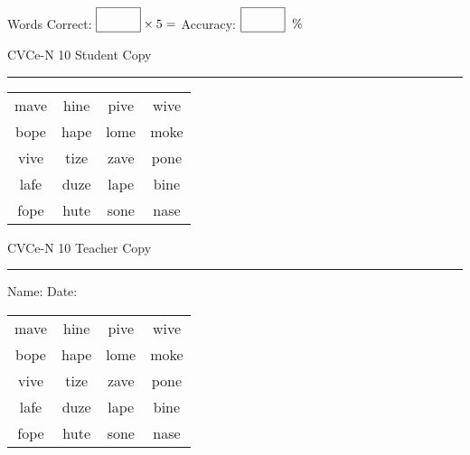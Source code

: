 \documentclass{memoir}
\begin{document}
\small

Words Correct: $\fbox{\phantom{\huge 100}} \times 5 = $ Accuracy: $\fbox{\phantom{\huge 100}}\;\; \%$ 

\vfill

\newpage


\footnotesize \noindent
CVCe-N 10 \hfill Student Copy
\smallskip
\hrule

\Large

\setlength{\tabcolsep}{14pt}
\def\arraystretch{2}

{\selectfont


\begin{vplace}[0.5]
\begin{center}
\begin{tabular}{cccc}
mave & hine & pive & wive \\
bope & hape & lome & moke \\
vive & tize & zave & pone \\
lafe & duze & lape & bine \\
fope & hute & sone & nase \\
\end{tabular}
\end{center}
\end{vplace}

}

\newpage

\footnotesize \noindent
CVCe-N 10 \hfill Teacher Copy
\smallskip
\hrule

\small

\vfill

\noindent
Name: \underline{\hspace{1.75in}} \hfill Date: \underline{\hspace{1in}}

\Large

{\selectfont


\begin{vplace}[0.5]
\begin{center}
\begin{tabular}{cccc}
mave & hine & pive & wive \\
bope & hape & lome & moke \\
vive & tize & zave & pone \\
lafe & duze & lape & bine \\
fope & hute & sone & nase \\
\end{tabular}
\end{center}
\end{vplace}



}
\end{document}
